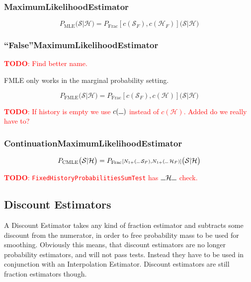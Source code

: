 \documentclass[11pt,a4paper]{article}
\newcommand{\Seq}{\mathcal{S}}
\newcommand{\Hist}{\mathcal{H}}
\newcommand{\SeqF}{\mathcal{S}_F}
\newcommand{\HistF}{\mathcal{H}_F}
\newcommand{\Skp}{\rule{7pt}{.5pt}}
\newcommand{\SmallSkp}{\rule{5pt}{.3pt}}
\newcommand{\todo}[1]{\textcolor{red}{\textbf{TODO}: #1}}
\begin{document}
  \subsubsection{MaximumLikelihoodEstimator}

  \begin{equation}
    P_\mathrm{MLE}\big(\Seq | \Hist\big) = P_\mathrm{Frac}{\scriptstyle[c(\SeqF) , c(\HistF)]}\big(\Seq | \Hist\big)
  \end{equation}

  \subsubsection{``False''MaximumLikelihoodEstimator}

  \todo{Find better name.}

  FMLE only works in the marginal probability setting.

  \begin{equation}
    P_\mathrm{FMLE}\big(\Seq | \Hist\big) = P_\mathrm{Frac}{\scriptstyle[c(\SeqF) , c(\Hist)]}\big(\Seq | \Hist\big)
  \end{equation}

  \todo{If history is empty we use $c(\Skp)$ instead of $c(\Hist)$. Added do we
  really have to?}

  \subsubsection{ContinuationMaximumLikelihoodEstimator}

  \begin{equation}
    P_\mathrm{CMLE}\big(\Seq | \Hist\big) = P_\mathrm{Frac}{\scriptstyle[N_{1+}(\SmallSkp \, \SeqF) , N_{1+}(\SmallSkp \, \HistF)]}\big(\Seq | \Hist\big)
  \end{equation}

  \todo{\texttt{FixedHistoryProbabilitiesSumTest} has $\Skp \Hist \Skp$ check.}

  \subsection{Discount Estimators}

  A Discount Estimator takes any kind of fraction estimator and subtracts some
  discount from the numerator, in order to free probability mass to be used for
  smoothing. Obviously this means, that discount estimators are no longer
  probability estimators, and will not pass tests. Instead they have to be used
  in conjunction with an Interpolation Estimator. Discount estimators are still
  fraction estimators though.
\end{document}
